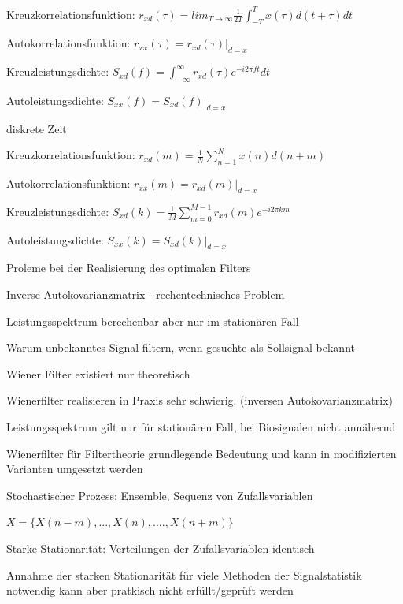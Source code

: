 \documentclass[a4paper]{article}
\begin{document}
\begin{multicols}{3}
\begin{itemize*}
    \begin{itemize*}
      \item Kreuzkorrelationsfunktion: $r_{xd}(\tau)=lim_{T\rightarrow\infty}\frac{1}{2T}\int_{-T}^T x(\tau)d(t+\tau)dt$
      \item Autokorrelationsfunktion: $r_{xx}(\tau)=r_{xd}(\tau)|_{d=x}$
      \item Kreuzleistungsdichte: $S_{xd}(f)=\int_{-\infty}^{\infty} r_{xd}(\tau)e^{-i2\pi ft}dt$
      \item Autoleistungsdichte: $S_{xx}(f)=S_{xd}(f)|_{d=x}$
    \end{itemize*}
    \item diskrete Zeit
    \begin{itemize*}
      \item Kreuzkorrelationsfunktion: $r_{xd}(m)=\frac{1}{N}\sum_{n=1}^N x(n)d(n+m)$
      \item Autokorrelationsfunktion: $r_{xx}(m)=r_{xd}(m)|_{d=x}$
      \item Kreuzleistungsdichte: $S_{xd}(k)=\frac{1}{M}\sum_{m=0}^{M-1} r_{xd}(m)e^{-i2\pi km}$
      \item Autoleistungsdichte: $S_{xx}(k)=S_{xd}(k)|_{d=x}$
    \end{itemize*}
  \end{itemize*}

  Proleme bei der Realisierung des optimalen Filters
  \begin{itemize*}
    \item Inverse Autokovarianzmatrix - rechentechnisches Problem
    \item Leistungsspektrum berechenbar aber nur im stationären Fall
    \item Warum unbekanntes Signal filtern, wenn gesuchte als Sollsignal bekannt
    \item Wiener Filter existiert nur theoretisch
    \item Wienerfilter realisieren in Praxis sehr schwierig. (inversen Autokovarianzmatrix)%
    \item Leistungsspektrum gilt nur für stationären Fall, bei Biosignalen nicht annähernd
    \item Wienerfilter für Filtertheorie grundlegende Bedeutung und kann in modifizierten Varianten umgesetzt werden
  \end{itemize*}

  Stochastischer Prozess: Ensemble, Sequenz von Zufallsvariablen
  \begin{itemize*}
    \item $X=\{X(n-m),...,X(n),....,X(n+m)\}$
    \item Starke Stationarität: Verteilungen der Zufallsvariablen identisch
    \item Annahme der starken Stationarität für viele Methoden der Signalstatistik notwendig %
    kann aber pratkisch nicht erfüllt/geprüft werden
  \end{itemize*}


\end{multicols}
\end{document}
